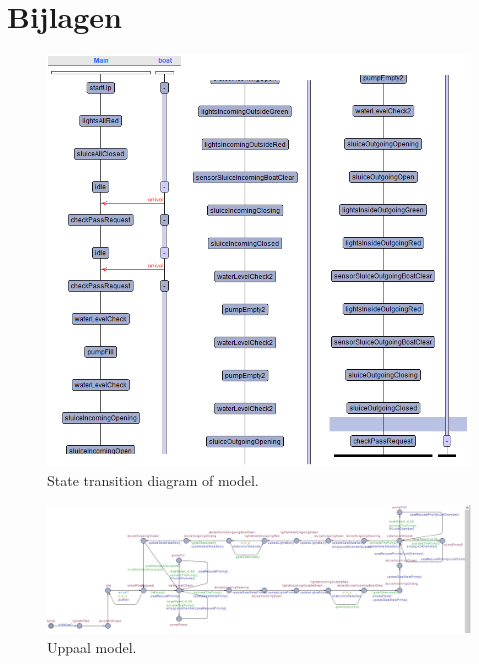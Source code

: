 \documentclass{article}
\begin{document}
\section{Bijlagen}

\begin{figure}[!h]
	\centering
	\includegraphics[width=\textwidth]{images/State diagram2.png}
    \caption{State transition diagram of model.}
	\label{fig:sluiceSensoren}
\end{figure}
\newpage
\begin{figure}[!h]
	\centering
	\includegraphics[width=\textwidth]{images/Uppaal_model.png}
    \caption{Uppaal model.}
	\label{fig:sluiceSensoren}
\end{figure}
\newpage


\end{document}
